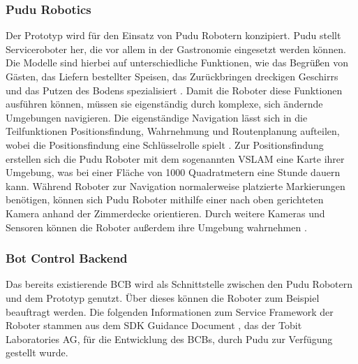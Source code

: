 \subsubsection{Pudu Robotics}
Der Prototyp wird für den Einsatz von Pudu Robotern konzipiert. Pudu stellt Serviceroboter her, die vor allem in der Gastronomie eingesetzt werden können. Die Modelle sind hierbei auf unterschiedliche Funktionen, wie das Begrüßen von Gästen, das Liefern bestellter Speisen, das Zurückbringen dreckigen Geschirrs und das Putzen des Bodens spezialisiert \cite{PUDU2024}. Damit die Roboter diese Funktionen ausführen können, müssen sie eigenständig durch komplexe, sich ändernde Umgebungen navigieren. Die eigenständige Navigation lässt sich in die Teilfunktionen Positionsfindung, Wahrnehmung und Routenplanung aufteilen, wobei die Positionsfindung eine Schlüsselrolle spielt \cite[S.~1]{Nature2022}. Zur Positionsfindung erstellen sich die Pudu Roboter mit dem sogenannten \ac{VSLAM} eine Karte ihrer Umgebung, was bei einer Fläche von 1000 Quadratmetern eine Stunde dauern kann. Während Roboter zur Navigation normalerweise platzierte Markierungen benötigen, können sich Pudu Roboter mithilfe einer nach oben gerichteten Kamera anhand der Zimmerdecke orientieren.\cite{Pudu2023} Durch weitere Kameras und Sensoren können die Roboter außerdem ihre Umgebung wahrnehmen \cite[S.~1]{Nature2022}.

\subsubsection{Bot Control Backend}\label{sec:BotControlBackend}
Das bereits existierende \ac{BCB} wird als Schnittstelle zwischen den Pudu Robotern und dem Prototyp genutzt. Über dieses können die Roboter zum Beispiel beauftragt werden. Die folgenden Informationen zum Service Framework der Roboter stammen aus dem SDK Guidance Document \cite{PuduSDK}, das der Tobit Laboratories AG, für die Entwicklung des \ac{BCB}s, durch Pudu zur Verfügung gestellt wurde.

